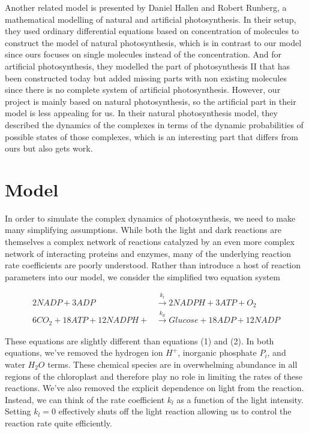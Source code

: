 \documentclass[12pt,reqno]{amsart}
\begin{document}
    Another related model is presented by Daniel Hallen and Robert
    Runberg, a mathematical modelling of natural and artificial
    photosynthesis\cite{hallen}. In their setup, they used  ordinary 
    differential equations based on concentration of molecules 
    to construct the model of natural photosynthesis, which is in 
    contrast to our model since ours focuses on single molecules 
    instead of the concentration. And for artificial
    photosynthesis, they modelled the part of photosynthesis II that has
    been constructed today but added missing parts with non existing
    molecules since there is no complete system of artificial photosynthesis.
    However, our project is mainly based on natural photosynthesis,
    so the artificial part in their model is less appealing for us.
    In their natural photosynthesis model, they described the dynamics
    of the complexes in terms of the dynamic probabilities of possible 
    states of those complexes, which is an interesting part that differs
    from ours but also gets work.   

    
    
	\section*{\large \textbf{Model}}
	
	In order to simulate the complex dynamics of photosynthesis, we need
	to make many simplifying assumptions. While both the light and dark
	reactions are themselves a complex network of reactions catalyzed 
	by an even more complex network of interacting proteins and enzymes,
	many of the underlying reaction rate coefficients are poorly understood.
	Rather than introduce a host of reaction parameters into our model, we
	consider the simplified two equation system
	
	\begin{align}
	    2 NADP + 3 ADP &\xrightarrow{k_l} 2NADPH + 3 ATP + O_2 \\
	    6 CO_2 + 18 ATP + 12 NADPH + &\xrightarrow{k_d}
        Glucose + 18 ADP + 12 NADP 	    
	\end{align}
	
	These equations are slightly different than equations (1) and (2).
	In both equations, we've removed the hydrogen ion $H^+$, inorganic
	phosphate $P_i$, and water $H_2O$ terms. These chemical species are
	in overwhelming abundance in all regions of the chloroplast and
	therefore play no role in limiting the rates of these reactions.
	We've also removed the explicit dependence on light from the 
	reaction.  Instead, we can think of the rate coefficient $k_l$ as 
	a function of the light intensity. Setting $k_l = 0$ effectively 
	shuts off the light reaction allowing us to control the reaction
	rate quite efficiently.
	
\end{document}
